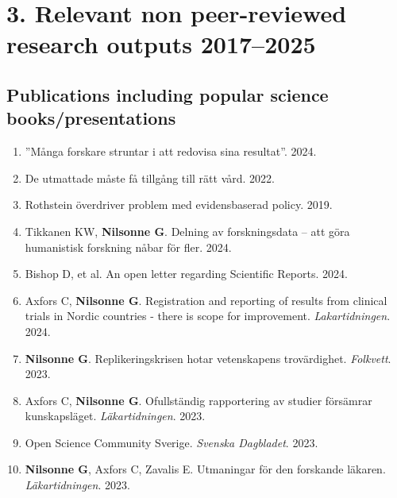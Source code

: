 \documentclass[11pt,a4paper]{article}
\begin{document}

\section*{3. Relevant non peer-reviewed research outputs 2017--2025}


\subsection*{Publications including popular science books/presentations}
\begin{enumerate}

\item ”Många forskare struntar i att redovisa sina resultat”. 2024.

\item De utmattade måste få tillgång till rätt vård. 2022.

\item Rothstein överdriver problem med evidensbaserad policy. 2019.

\item Tikkanen KW, \textbf{Nilsonne G}. Delning av forskningsdata – att göra humanistisk forskning nåbar för fler. 2024.

\item Bishop D, et al. An open letter regarding Scientific Reports. 2024.

\item Axfors C, \textbf{Nilsonne G}. Registration and reporting of results from clinical trials in Nordic countries - there is scope for improvement. \textit{Lakartidningen}. 2024.

\item \textbf{Nilsonne G}. Replikeringskrisen hotar vetenskapens trovärdighet. \textit{Folkvett}. 2023.

\item Axfors C, \textbf{Nilsonne G}. Ofullständig rapportering av studier försämrar kunskapsläget. \textit{Läkartidningen}. 2023.

\item Open Science Community Sverige. \textit{Svenska Dagbladet}. 2023.

\item \textbf{Nilsonne G}, Axfors C, Zavalis E. Utmaningar för den forskande läkaren. \textit{Läkartidningen}. 2023.


\end{enumerate}
\end{document}
